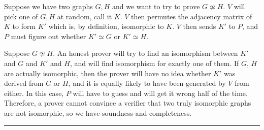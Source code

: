 \documentclass[twoside]{article}
\newenvironment{proof}{{\bf Proof:}}{\hfill\rule{2mm}{2mm}}
\begin{document}
\begin{proof}
	
	Suppose we have two graphs $G,H$ and we want to try to prove $G\not\simeq H$.  $V$ will pick one of $G,H$ at random, call it $K$.  $V$ then permutes the adjacency matrix of $K$ to form $K'$ which is, by definition, isomorphic to $K$.  $V$ then sends $K'$ to $P$, and $P$ must figure out whether $K'\simeq G$ or $K'\simeq H$.  
	
	
	Suppose $G\not\simeq H$.  An honest prover will try to find an isomorphism between $K'$ and $G$ and $K'$ and $H$, and will find isomorphism for exactly one of them.  If $G$, $H$ are actually isomorphic, then the prover will have no idea whether $K'$ was derived from $G$ or $H$, and it is equally likely to have been generated by $V$ from either.  In this case, $P$ will have to guess and will get it wrong half of the time.  Therefore, a prover cannot convince a verifier that two truly isomorphic graphs are not isomorphic, so we have soundness and completeness.
	
	\end{proof}



\end{document}
